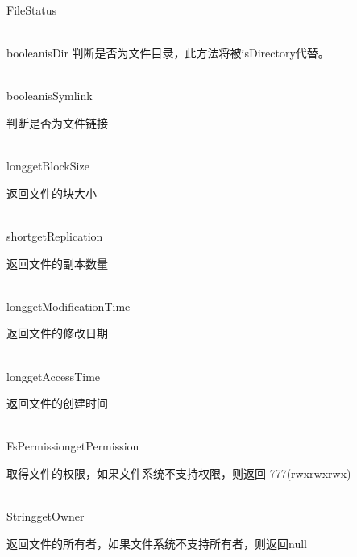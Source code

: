 \begin{XeClass}{FileStatus}
\begin{XeMethod}{\XePublic\\ }{boolean}{isDir}
 判断是否为文件目录，此方法将被isDirectory代替。

  \end{XeMethod}

  \begin{XeMethod}{\XePublic\\ }{boolean}{isSymlink}
       
 判断是否为文件链接

  \end{XeMethod}

  \begin{XeMethod}{\XePublic\\ }{long}{getBlockSize}
       
 返回文件的块大小

  \end{XeMethod}

  \begin{XeMethod}{\XePublic\\ }{short}{getReplication}
       
 返回文件的副本数量

  \end{XeMethod}

  \begin{XeMethod}{\XePublic\\ }{long}{getModificationTime}
       
 返回文件的修改日期

  \end{XeMethod}

  \begin{XeMethod}{\XePublic\\ }{long}{getAccessTime}
       
 返回文件的创建时间

  \end{XeMethod}

  \begin{XeMethod}{\XePublic\\ }{FsPermission}{getPermission}
       
 取得文件的权限，如果文件系统不支持权限，则返回 777(rwxrwxrwx)

  \end{XeMethod}

  \begin{XeMethod}{\XePublic\\ }{String}{getOwner}
       
 返回文件的所有者，如果文件系统不支持所有者，则返回null

  \end{XeMethod}


\end{XeClass}
